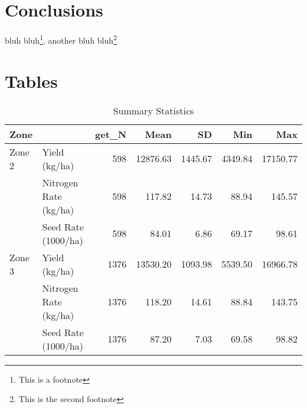 \documentclass[
  12pt,
]{article}
\begin{document}
\hypertarget{conclusions}{%
\section{Conclusions}\label{conclusions}}

bluh bluh\footnote{This is a footnote}, another bluh bluh\footnote{This is the second footnote}

\newpage

\hypertarget{tables}{%
\section{Tables}\label{tables}}

\begin{table}[H]

\caption{\label{tab:sum-stat}Summary Statistics}
\centering
\begin{tabular}[t]{llrrrrr}
\toprule
Zone &   & get\_N & Mean & SD & Min & Max\\
\midrule
Zone 2 & Yield (kg/ha) & 598 & \num{12876.63} & \num{1445.67} & \num{4349.84} & \num{17150.77}\\
 & Nitrogen Rate (kg/ha) & 598 & \num{117.82} & \num{14.73} & \num{88.94} & \num{145.57}\\
 & Seed Rate (1000/ha) & 598 & \num{84.01} & \num{6.86} & \num{69.17} & \num{98.61}\\
Zone 3 & Yield (kg/ha) & 1376 & \num{13530.20} & \num{1093.98} & \num{5539.50} & \num{16966.78}\\
 & Nitrogen Rate (kg/ha) & 1376 & \num{118.20} & \num{14.61} & \num{88.84} & \num{143.75}\\
 & Seed Rate (1000/ha) & 1376 & \num{87.20} & \num{7.03} & \num{69.58} & \num{98.82}\\
\bottomrule
\end{tabular}
\end{table}
\end{document}
